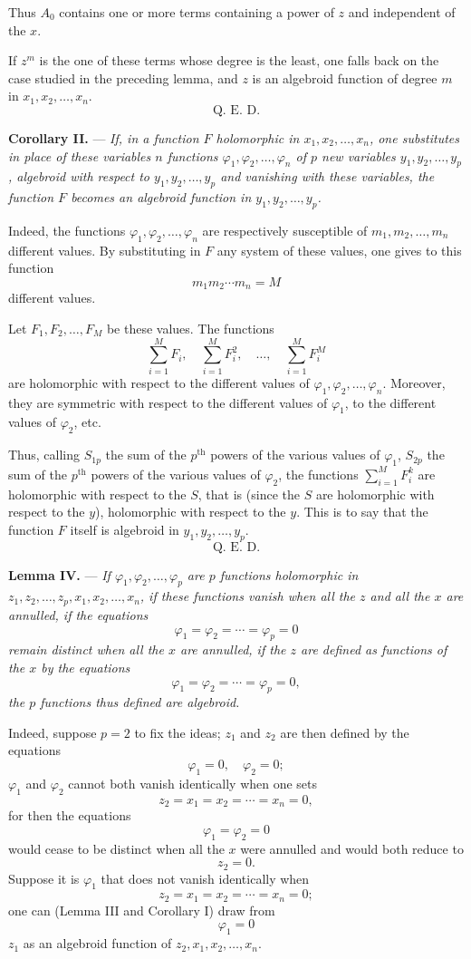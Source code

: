 \documentclass[11pt]{article}
\begin{document}
Thus $A_0$ contains one or more terms containing a power of $z$ and independent of the $x$.

If $z^m$ is the one of these terms whose degree is the least, one falls back on the case studied in the preceding lemma, and $z$ is an algebroid function of degree $m$ in $x_1,x_2,\ldots,x_n$.
\[
\text{Q. E. D.}
\]

\medskip
\noindent\textbf{Corollary II.} — \emph{If, in a function $F$ holomorphic in $x_1,x_2,\ldots,x_n$, one substitutes in place of these variables $n$ functions $\varphi_1,\varphi_2,\ldots,\varphi_n$ of $p$ new variables $y_1,y_2,\ldots,y_p$, algebroid with respect to $y_1,y_2,\ldots,y_p$ and vanishing with these variables, the function $F$ becomes an algebroid function in $y_1,y_2,\ldots,y_p$.}

Indeed, the functions $\varphi_1,\varphi_2,\ldots,\varphi_n$ are respectively susceptible of $m_1,m_2,\ldots,m_n$ different values. By substituting in $F$ any system of these values, one gives to this function
\[
m_1m_2\cdots m_n=M
\]
different values.

Let $F_1,F_2,\ldots,F_M$ be these values. The functions
\[
\sum_{i=1}^{M}F_i,
\quad \sum_{i=1}^{M}F_i^2,
\quad \ldots,
\quad \sum_{i=1}^{M}F_i^M
\]
are holomorphic with respect to the different values of $\varphi_1,\varphi_2,\ldots,\varphi_n$. Moreover, they are symmetric with respect to the different values of $\varphi_1$, to the different values of $\varphi_2$, etc.

Thus, calling $S_{1p}$ the sum of the $p^\text{th}$ powers of the various values of $\varphi_1$, $S_{2p}$ the sum of the $p^\text{th}$ powers of the various values of $\varphi_2$, the functions $\sum_{i=1}^{M}F_i^k$ are holomorphic with respect to the $S$, that is (since the $S$ are holomorphic with respect to the $y$), holomorphic with respect to the $y$. This is to say that the function $F$ itself is algebroid in $y_1,y_2,\ldots,y_p$.
\[
\text{Q. E. D.}
\]

\medskip
\noindent\textbf{Lemma IV.} — \emph{If $\varphi_1,\varphi_2,\ldots,\varphi_p$ are $p$ functions holomorphic in $z_1,z_2,\ldots,z_p,x_1,x_2,\ldots,x_n$, if these functions vanish when all the $z$ and all the $x$ are annulled, if the equations}
\[
\varphi_1=\varphi_2=\cdots=\varphi_p=0
\]
\emph{remain distinct when all the $x$ are annulled, if the $z$ are defined as functions of the $x$ by the equations}
\[
\varphi_1=\varphi_2=\cdots=\varphi_p=0,
\]
\emph{the $p$ functions thus defined are algebroid.}

Indeed, suppose $p=2$ to fix the ideas; $z_1$ and $z_2$ are then defined by the equations
\[
\varphi_1=0,
\quad \varphi_2=0;
\]
$\varphi_1$ and $\varphi_2$ cannot both vanish identically when one sets
\[
z_2=x_1=x_2=\cdots=x_n=0,
\]
for then the equations
\[
\varphi_1=\varphi_2=0
\]
would cease to be distinct when all the $x$ were annulled and would both reduce to
\[
z_2=0.
\]
Suppose it is $\varphi_1$ that does not vanish identically when
\[
z_2=x_1=x_2=\cdots=x_n=0;
\]
one can (Lemma III and Corollary I) draw from
\[
\varphi_1=0
\]
$z_1$ as an algebroid function of $z_2,x_1,x_2,\ldots,x_n$.
\end{document}
